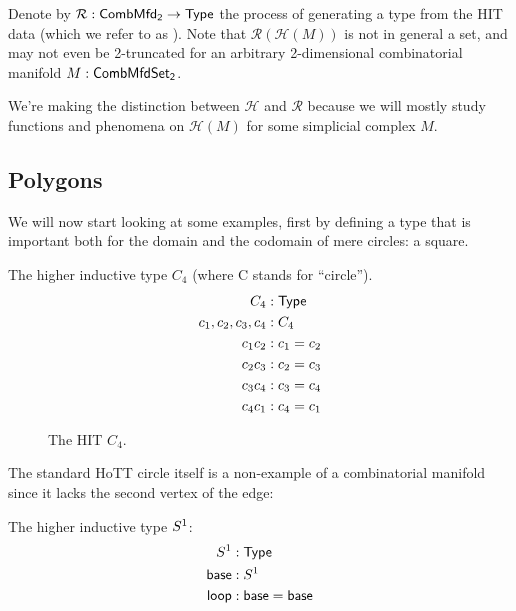 \begin{mydef}
Denote by \( \mathcal{R}:\mathsf{CombMfd_2}\to\mathsf{Type} \) the process of generating a type from the HIT data (which we refer to as ). Note that \( \mathcal{R}(\mathcal{H}(M)) \) is not in general a set, and may not even be 2-truncated for an arbitrary 2-dimensional combinatorial manifold \( M:\mathsf{CombMfdSet_2} \).
\end{mydef}

We're making the distinction between \( \mathcal{H} \) and \( \mathcal{R} \) because we will mostly study functions and phenomena on \( \mathcal{H}(M) \) for some simplicial complex \( M \).

\subsection{Polygons}\label{sec:polygons}

We will now start looking at some examples, first by defining a type that is important both for the domain and the codomain of mere circles: a square.

\begin{mydef}
The higher inductive type \( C_4 \) (where C stands for ``circle'').
\begin{align*}
C_4 &: \mathsf{Type} \\
c_1, c_2, c_3, c_4 &: C_4 \\
c_1c_2 &: c_1 = c_2 \\
c_2c_3 &: c_2 = c_3 \\
c_3c_4 &: c_3 = c_4 \\
c_4c_1 &: c_4 = c_1 \\
\end{align*}
\end{mydef}

\begin{figure}[htbp]
\centering

\caption{The HIT \( C_4 \).}
\end{figure}

The standard HoTT circle itself is a non-example of a combinatorial manifold since it lacks the second vertex of the edge:

\begin{mydef}
The higher inductive type \( S^1 \):
\begin{align*}
S^1 &:\mathsf{Type} \\
\mathsf{base}&:S^1 \\
\mathsf{loop}&:\mathsf{base}=\mathsf{base}
\end{align*}
\end{mydef}

